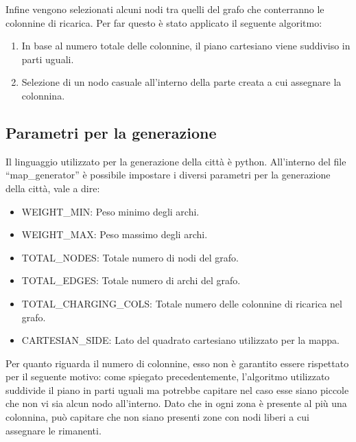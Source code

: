 Infine vengono selezionati alcuni nodi tra quelli del grafo che conterranno le colonnine di ricarica. Per far questo è stato applicato il seguente algoritmo:
\begin{enumerate}
	\item In base al numero totale delle colonnine, il piano cartesiano viene suddiviso in parti uguali.
	\item Selezione di un nodo casuale all'interno della parte creata a cui assegnare la colonnina.
\end{enumerate}

\subsection{Parametri per la generazione}
Il linguaggio utilizzato per la generazione della città è python. All'interno del file ``map\_generator'' è possibile impostare i diversi parametri per la generazione della città, vale a dire:
\begin{itemize}
	\item WEIGHT\_MIN: Peso minimo degli archi.
	\item WEIGHT\_MAX:  Peso massimo degli archi.
	\item TOTAL\_NODES: Totale numero di nodi del grafo.
	\item TOTAL\_EDGES:  Totale numero di archi del grafo.
	\item TOTAL\_CHARGING\_COLS:  Totale numero delle colonnine di ricarica nel grafo.
	\item CARTESIAN\_SIDE:  Lato del quadrato cartesiano utilizzato per la mappa.
\end{itemize}

Per quanto riguarda il numero di colonnine, esso non è garantito essere rispettato per il seguente motivo: come spiegato precedentemente, l'algoritmo utilizzato suddivide il piano in parti uguali ma potrebbe capitare nel caso esse siano piccole che non vi sia alcun nodo all'interno. Dato che in ogni zona è presente al più una colonnina, può capitare che non siano presenti zone con nodi liberi a cui assegnare le rimanenti.

